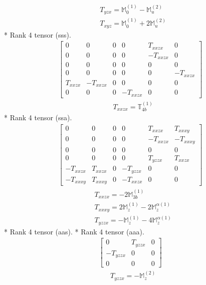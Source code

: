 \documentclass[fleqn,8pt,landscape]{jsarticle}
\begin{document}
\begin{align*}
& T_{yzx} = \mathbb{M}_{0}^{(1)} - \mathbb{M}_{u}^{(2)} \\
& T_{xyz} = \mathbb{M}_{0}^{(1)} + 2 \mathbb{M}_{u}^{(2)}
\end{align*}
* Rank 4 tensor (sss).
\begin{align*}
\begin{bmatrix} 0 & 0 & 0 & 0 & T_{xxzx} & 0 \\ 0 & 0 & 0 & 0 & - T_{xxzx} & 0 \\ 0 & 0 & 0 & 0 & 0 & 0 \\ 0 & 0 & 0 & 0 & 0 & - T_{xxzx} \\ T_{xxzx} & - T_{xxzx} & 0 & 0 & 0 & 0 \\ 0 & 0 & 0 & - T_{xxzx} & 0 & 0 \end{bmatrix}
\end{align*}
\begin{align*}
& T_{xxzx} = \mathbb{T}_{4b}^{(1)}
\end{align*}
* Rank 4 tensor (ssa).
\begin{align*}
\begin{bmatrix} 0 & 0 & 0 & 0 & T_{xxzx} & T_{xxxy} \\ 0 & 0 & 0 & 0 & - T_{xxzx} & - T_{xxxy} \\ 0 & 0 & 0 & 0 & 0 & 0 \\ 0 & 0 & 0 & 0 & T_{yzzx} & T_{xxzx} \\ - T_{xxzx} & T_{xxzx} & 0 & - T_{yzzx} & 0 & 0 \\ - T_{xxxy} & T_{xxxy} & 0 & - T_{xxzx} & 0 & 0 \end{bmatrix}
\end{align*}
\begin{align*}
& T_{xxzx} = - 2 \mathbb{M}_{3b}^{(1)} \\
& T_{xxxy} = 2 \mathbb{M}_{z}^{(1)} - 2 \mathbb{M}_{z}^{\alpha(1)} \\
& T_{yzzx} = - \mathbb{M}_{z}^{(1)} - 4 \mathbb{M}_{z}^{\alpha(1)}
\end{align*}
* Rank 4 tensor (aas).
* Rank 4 tensor (aaa).
\begin{align*}
\begin{bmatrix} 0 & T_{yzzx} & 0 \\ - T_{yzzx} & 0 & 0 \\ 0 & 0 & 0 \end{bmatrix}
\end{align*}
\begin{align*}
& T_{yzzx} = - \mathbb{M}_{z}^{(2)}
\end{align*}
\end{document}
